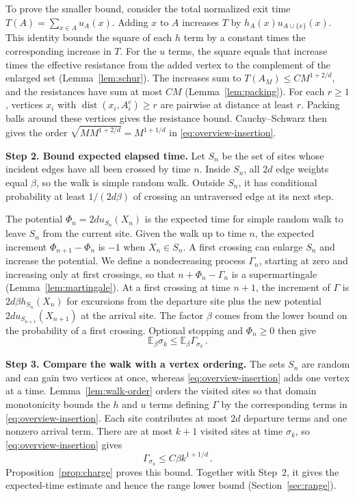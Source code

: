 \documentclass[11pt]{amsart}
\theoremstyle{plain}
\theoremstyle{definition}
\newcommand{\E}{\mathbb E}
\newcommand{\dist}{\operatorname{dist}}
\begin{document}
	To prove the smaller bound, consider the total normalized exit time
	$T(A)=\sum_{x\in A}u_A(x)$. Adding $x$ to $A$ increases $T$ by
	$h_A(x)u_{A\cup\{x\}}(x)$. This identity bounds the square of each $h$ term
	by a constant times the corresponding increase in $T$. For the $u$ terms,
	the square equals that increase times the effective resistance from the
	added vertex to the complement of the enlarged set (Lemma~\ref{lem:schur}).
	The increases sum to $T(A_M)\leq CM^{1+2/d}$, and the resistances have sum
	at most $CM$ (Lemma~\ref{lem:packing}). For each $r\geq1$, vertices $x_i$
	with $\dist(x_i,A_i^c)\geq r$ are pairwise at distance at least $r$.
	Packing balls around these vertices gives the resistance bound. Cauchy--Schwarz then gives the order
	$\sqrt{M M^{1+2/d}}=M^{1+1/d}$ in \eqref{eq:overview-insertion}.

	\medskip
	\noindent\textbf{Step 2. Bound expected elapsed time.}
	Let $S_n$ be the set of sites whose incident edges have all been crossed
	by time $n$. Inside $S_n$, all $2d$ edge weights equal $\beta$, so the
	walk is simple random walk. Outside $S_n$, it has conditional probability
	at least $1/(2d\beta)$ of crossing an untraversed edge at its next step.

	The potential $\Phi_n=2du_{S_n}(X_n)$ is the expected time for simple
	random walk to leave $S_n$ from the current site. Given the walk up to time $n$, the expected
	increment $\Phi_{n+1}-\Phi_n$ is $-1$ when $X_n\in S_n$. A first crossing can
	enlarge $S_n$ and increase the potential. We define a nondecreasing
	process $\Gamma_n$, starting at zero and increasing
	only at first crossings, so that $n+\Phi_n-\Gamma_n$ is a supermartingale
	(Lemma~\ref{lem:martingale}). At a first crossing at time $n+1$, the increment of $\Gamma$ is
	$2d\beta h_{S_n}(X_n)$ for excursions from the departure site plus
	the new potential $2du_{S_{n+1}}(X_{n+1})$ at the arrival site. The factor $\beta$ comes from the
	lower bound on the probability of a first crossing. Optional stopping
	and $\Phi_n\geq0$ then give
	\[
	\E_\beta\sigma_k\leq\E_\beta\Gamma_{\sigma_k}\, .
	\]

	\medskip
	\noindent\textbf{Step 3. Compare the walk with a vertex ordering.}
	The sets $S_n$ are random and can gain two vertices at once, whereas
	\eqref{eq:overview-insertion} adds one vertex at a time.
	Lemma~\ref{lem:walk-order} orders the visited sites so that domain
	monotonicity bounds the $h$ and $u$ terms defining $\Gamma$ by the
	corresponding terms in \eqref{eq:overview-insertion}.
	Each site contributes at most $2d$ departure terms and one
	nonzero arrival term. There are at most $k+1$ visited sites at time
	$\sigma_k$, so \eqref{eq:overview-insertion} gives
	\[
	\Gamma_{\sigma_k}\leq C\beta k^{1+1/d}\, .
	\]
	Proposition~\ref{prop:charge} proves this bound. Together with Step~2,
	it gives the expected-time estimate and hence the range lower bound
	(Section~\ref{sec:range}).
\end{document}
